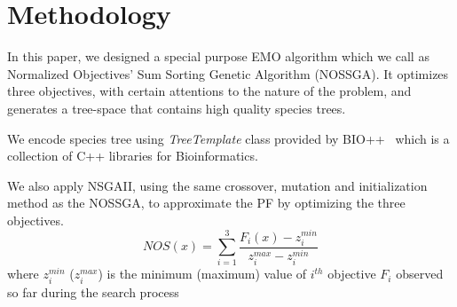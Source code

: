 \section{Methodology}
\label{sec:method}
In this paper, we designed a special purpose EMO algorithm which we call as Normalized Objectives' Sum Sorting Genetic Algorithm (NOSSGA). It optimizes three objectives, with certain attentions to the nature of the problem, and generates a tree-space that contains high quality species trees. 

We encode species tree using \textit{TreeTemplate} class provided by BIO++~\cite{gueguen2013bpp} which is a collection of C++ libraries for Bioinformatics. 

We also apply NSGAII, using the same crossover, mutation and initialization method as the NOSSGA, to approximate the PF by optimizing the three objectives. 
\begin{equation}\label{eqn:nos}
NOS(x) = \sum_{i=1}^{3} \frac{F_i(x)-z_i^{min}}{z_i^{max}-z_i^{min}}
\end{equation}
where $z_i^{min}$ ($z_i^{max}$) is the minimum (maximum) value of $i^{th}$ objective $F_i$ observed so far during the search process
